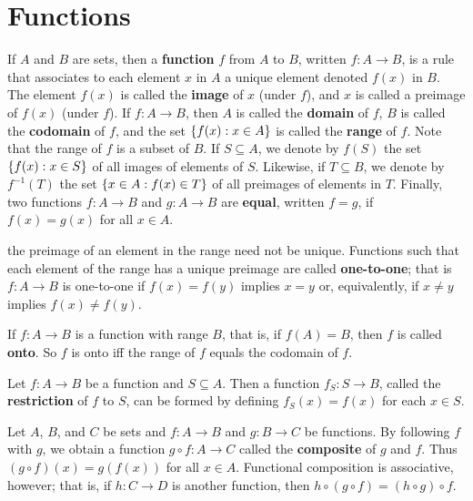 \chapter{Functions}\label{ch:b}

\begin{defn}\label{b.0.1}
  If \(A\) and \(B\) are sets, then a \textbf{function} \(f\) from \(A\) to \(B\), written \(f : A \to B\), is a rule that associates to each element \(x\) in \(A\) a unique element denoted \(f(x)\) in \(B\).
  The element \(f(x)\) is called the \textbf{image} of \(x\) (under \(f\)), and \(x\) is called a preimage of \(f(x)\) (under \(f\)).
  If \(f : A \to B\), then \(A\) is called the \textbf{domain} of \(f\), \(B\) is called the \textbf{codomain} of \(f\), and the set \(\left\lbrace f(x) : x \in A\right\rbrace\) is called the \textbf{range} of \(f\).
  Note that the range of \(f\) is a subset of \(B\).
  If \(S \subseteq A\), we denote by \(f(S)\) the set \(\left\lbrace f(x) : x \in S\right\rbrace\) of all images of elements of \(S\).
  Likewise, if \(T \subseteq B\), we denote by \(f^{-1}(T)\) the set \(\left\lbrace x \in A : f(x) \in T\right\rbrace\) of all preimages of elements in \(T\).
  Finally, two functions \(f : A \to B\) and \(g : A \to B\) are \textbf{equal}, written \(f = g\), if \(f(x) = g(x)\) for all \(x \in A\).
\end{defn}

\begin{defn}\label{b.0.2}
  the preimage of an element in the range need not be unique.
  Functions such that each element of the range has a unique preimage are called \textbf{one-to-one};
  that is \(f : A \to B\) is one-to-one if \(f(x) = f(y)\) implies \(x = y\) or, equivalently, if \(x \neq y\) implies \(f(x) \neq f(y)\).
\end{defn}

\begin{defn}\label{b.0.3}
  If \(f : A \to B\) is a function with range \(B\), that is, if \(f(A) = B\), then \(f\) is called \textbf{onto}.
  So \(f\) is onto iff the range of \(f\) equals the codomain of \(f\).
\end{defn}

\begin{defn}\label{b.0.4}
  Let \(f : A \to B\) be a function and \(S \subseteq A\).
  Then a function \(f_S : S \to B\), called the \textbf{restriction} of \(f\) to \(S\), can be formed by defining \(f_S(x) = f(x)\) for each \(x \in S\).
\end{defn}

\begin{defn}\label{b.0.5}
  Let \(A\), \(B\), and \(C\) be sets and \(f : A \to B\) and \(g : B \to C\) be functions.
  By following \(f\) with \(g\), we obtain a function \(g \circ f : A \to C\) called the \textbf{composite} of \(g\) and \(f\).
  Thus \((g \circ f)(x) = g(f(x))\) for all \(x \in A\).
  Functional composition is associative, however;
  that is, if \(h : C \to D\) is another function, then \(h \circ (g \circ f) = (h \circ g) \circ f\).
\end{defn}

